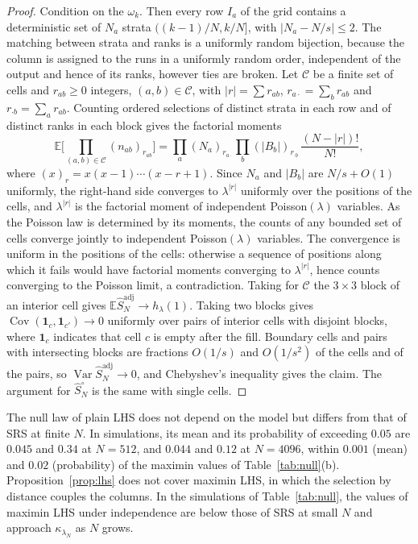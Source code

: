 \documentclass[11pt,a4paper]{article}
\theoremstyle{definition}
\theoremstyle{remark}
\newcommand{\E}{\mathbb{E}}
\newcommand{\Var}{\operatorname{Var}}
\newcommand{\Cov}{\operatorname{Cov}}
\newcommand{\ind}{\mathbf{1}}
\newcommand{\Sadj}{\hat S^{\mathrm{adj}}_N}
\newcommand{\Sun}{\hat S^{\circ}_N}
\begin{document}
\begin{proof}
Condition on the $\omega_k$. Then every row $I_a$ of the grid contains a deterministic set of $N_a$ strata $((k-1)/N,k/N]$, with $|N_a-N/s|\le2$. The matching between strata and ranks is a uniformly random bijection, because the column is assigned to the runs in a uniformly random order, independent of the output and hence of its ranks, however ties are broken. Let $\mathcal C$ be a finite set of cells and $r_{ab}\ge0$ integers, $(a,b)\in\mathcal C$, with $|r|=\sum r_{ab}$, $r_{a\cdot}=\sum_br_{ab}$ and $r_{\cdot b}=\sum_ar_{ab}$. Counting ordered selections of distinct strata in each row and of distinct ranks in each block gives the factorial moments
\[
\E\Big[\prod_{(a,b)\in\mathcal C}(n_{ab})_{r_{ab}}\Big]=\prod_a(N_a)_{r_{a\cdot}}\prod_b(|B_b|)_{r_{\cdot b}}\,\frac{(N-|r|)!}{N!},
\]
where $(x)_r=x(x-1)\cdots(x-r+1)$. Since $N_a$ and $|B_b|$ are $N/s+O(1)$ uniformly, the right-hand side converges to $\lambda^{|r|}$ uniformly over the positions of the cells, and $\lambda^{|r|}$ is the factorial moment of independent Poisson$(\lambda)$ variables. As the Poisson law is determined by its moments, the counts of any bounded set of cells converge jointly to independent Poisson$(\lambda)$ variables. The convergence is uniform in the positions of the cells: otherwise a sequence of positions along which it fails would have factorial moments converging to $\lambda^{|r|}$, hence counts converging to the Poisson limit, a contradiction. Taking for $\mathcal C$ the $3\times3$ block of an interior cell gives $\E\Sadj\to h_\lambda(1)$. Taking two blocks gives $\Cov(\ind_c,\ind_{c'})\to0$ uniformly over pairs of interior cells with disjoint blocks, where $\ind_c$ indicates that cell $c$ is empty after the fill. Boundary cells and pairs with intersecting blocks are fractions $O(1/s)$ and $O(1/s^2)$ of the cells and of the pairs, so $\Var\Sadj\to0$, and Chebyshev's inequality gives the claim. The argument for $\Sun$ is the same with single cells.
\end{proof}

The null law of plain LHS does not depend on the model but differs from that of SRS at finite $N$. In simulations, its mean and its probability of exceeding $0.05$ are $0.045$ and $0.34$ at $N=512$, and $0.044$ and $0.12$ at $N=4096$, within $0.001$ (mean) and $0.02$ (probability) of the maximin values of Table~\ref{tab:null}(b). Proposition~\ref{prop:lhs} does not cover maximin LHS, in which the selection by distance couples the columns. In the simulations of Table~\ref{tab:null}, the values of maximin LHS under independence are below those of SRS at small $N$ and approach $\kappa_{\lambda_N}$ as $N$ grows.
\end{document}
